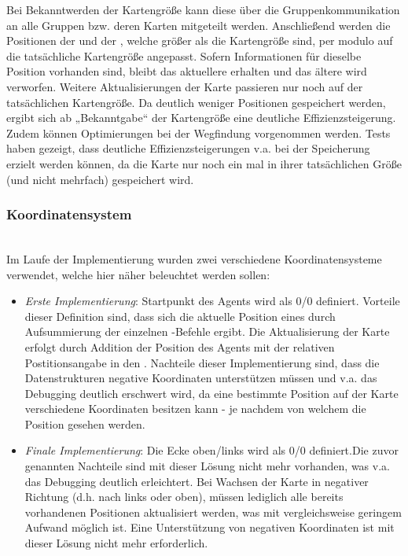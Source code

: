 Bei Bekanntwerden der Kartengröße kann diese über die Gruppenkommunikation an alle Gruppen bzw. deren Karten mitgeteilt werden. Anschließend werden die Positionen der \NextMapTiles und der \Agents, welche größer als die Kartengröße sind, per modulo auf die tatsächliche Kartengröße angepasst. Sofern Informationen für dieselbe Position vorhanden sind, bleibt das aktuellere \NextMapTile erhalten und das ältere wird verworfen. Weitere Aktualisierungen der Karte passieren nur noch auf der tatsächlichen Kartengröße. Da deutlich weniger Positionen gespeichert werden, ergibt sich ab „Bekanntgabe“ der Kartengröße eine deutliche Effizienzsteigerung. Zudem können Optimierungen bei der Wegfindung vorgenommen werden. Tests haben gezeigt, dass deutliche Effizienzsteigerungen v.a. bei der Speicherung erzielt werden können, da die Karte nur noch ein mal in ihrer tatsächlichen Größe (und nicht mehrfach) gespeichert wird.  

\subsubsection{Koordinatensystem} ~\\
Im Laufe der Implementierung wurden zwei verschiedene Koordinatensysteme verwendet, welche hier näher beleuchtet werden sollen: 
\begin{itemize}
	\item \textit{Erste Implementierung}: Startpunkt des Agents wird als 0/0 definiert. \newline Vorteile dieser Definition sind, dass sich die aktuelle Position eines \Agents durch Aufsummierung der einzelnen \move-Befehle ergibt. Die Aktualisierung der Karte erfolgt durch Addition der Position des Agents mit der relativen Postitionsangabe in den \Percepts. Nachteile dieser Implementierung sind, dass die Datenstrukturen negative Koordinaten unterstützen müssen und v.a. das Debugging deutlich erschwert wird, da eine bestimmte Position auf der Karte verschiedene Koordinaten besitzen kann - je nachdem von welchem \Agent die Position \glqq{}gesehen\grqq{} werden. 
	\item \textit{Finale Implementierung}: Die Ecke oben/links wird als 0/0 definiert.\newline Die zuvor genannten Nachteile sind mit dieser Lösung nicht mehr vorhanden, was v.a. das Debugging deutlich erleichtert. Bei \glqq{}Wachsen\grqq{} der Karte in negativer Richtung (d.h. nach links oder oben), müssen lediglich alle bereits vorhandenen Positionen aktualisiert werden, was mit vergleichsweise geringem Aufwand möglich ist. Eine Unterstützung von negativen Koordinaten ist mit dieser Lösung nicht mehr erforderlich. 
\end{itemize}

